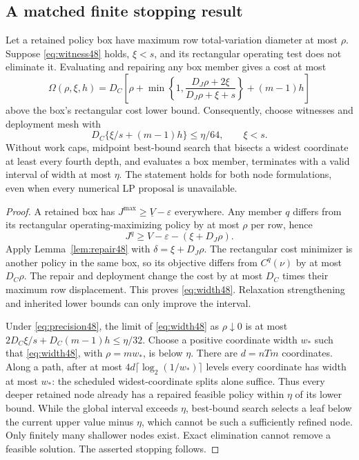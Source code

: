 \subsection{A matched finite stopping result}
\begin{theorem}\label{thm:finite48}
Let a retained policy box have maximum row total-variation diameter at most $\rho$. Suppose \eqref{eq:witness48} holds, $\xi<s$, and its rectangular operating test does not eliminate it. Evaluating and repairing any box member gives a cost at most
\begin{equation}\label{eq:width48}
 \Omega(\rho,\xi,h)=D_C\left[\rho+
 \min\left\{1,\frac{D_J\rho+2\xi}{D_J\rho+\xi+s}\right\}+(m-1)h\right]
\end{equation}
above the box's rectangular cost lower bound. Consequently, choose witnesses and deployment mesh with
\begin{equation}\label{eq:precision48}
 D_C\{\xi/s+(m-1)h\}\le\eta/64,
 \qquad \xi<s.
\end{equation}
Without work caps, midpoint best-bound search that bisects a widest coordinate at least every fourth depth, and evaluates a box member, terminates with a valid interval of width at most $\eta$. The statement holds for both node formulations, even when every numerical LP proposal is unavailable.
\end{theorem}
\begin{proof}
A retained box has $J^{\max}\ge\underline V-\varepsilon$ everywhere. Any member $q$ differs from its rectangular operating-maximizing policy by at most $\rho$ per row, hence
\[
 J^q\ge V-\varepsilon-(\xi+D_J\rho).
\]
Apply Lemma~\ref{lem:repair48} with $\delta=\xi+D_J\rho$. The rectangular cost minimizer is another policy in the same box, so its objective differs from $C^q(\nu)$ by at most $D_C\rho$. The repair and deployment change the cost by at most $D_C$ times their maximum row displacement. This proves \eqref{eq:width48}. Relaxation strengthening and inherited lower bounds can only improve the interval.

Under \eqref{eq:precision48}, the limit of \eqref{eq:width48} as $\rho\downarrow0$ is at most $2D_C\xi/s+D_C(m-1)h\le\eta/32$. Choose a positive coordinate width $w_*$ such that \eqref{eq:width48}, with $\rho=mw_*$, is below $\eta$. There are $d=nTm$ coordinates. Along a path, after at most $4d\lceil\log_2(1/w_*)\rceil$ levels every coordinate has width at most $w_*$: the scheduled widest-coordinate splits alone suffice. Thus every deeper retained node already has a repaired feasible policy within $\eta$ of its lower bound. While the global interval exceeds $\eta$, best-bound search selects a leaf below the current upper value minus $\eta$, which cannot be such a sufficiently refined node. Only finitely many shallower nodes exist. Exact elimination cannot remove a feasible solution. The asserted stopping follows.
\end{proof}

